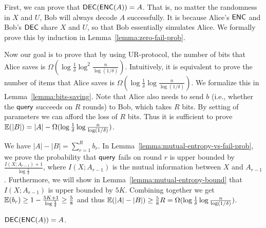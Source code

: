 First, we can prove that $\textsf{DEC}(\textsf{ENC}(A))=A$. That is, no matter the randomness in $X$ and $U$, Bob will always decode $A$ successfully. It is because Alice's $\textsf{ENC}$ and Bob's $\textsf{DEC}$ share $X$ and $U$, so that Bob essentially simulates Alice. We formally prove this by induction in Lemma~\ref{lemma:zero-fail-prob}. 

Now our goal is to prove that by using UR-protocol, the number of bits that Alice saves is $\Omega(\log \frac{1}{\delta}\log^2 \frac{n}{\log (1/\delta)} )$. Intuitively, it is equivalent to prove the number of items that Alice saves is $\Omega(\log \frac{1}{\delta}\log \frac{n}{\log (1/\delta)} )$.
We formalize this in Lemma~\ref{lemma:bits-saving}. Note that Alice also needs to send $b$ (i.e., whether the $\mathsf{query}$ succeeds on $R$ rounds) to Bob, which takes $R$ bits. By setting of parameters we can afford the loss of $R$ bits. Thus it is sufficient to prove $\operatorname*{\mathbb{E}}(|B|)=|A|-\Omega(\log \frac{1}{\delta}\log \frac{n}{\log (1/\delta)})$. 

We have $|A|-|B|=\sum_{r=1}^{R}b_r$. 
In Lemma~\ref{lemma:mutual-entropy-vs-fail-prob}, we prove the probability that $\mathsf{query}$ fails on round $r$ is upper bounded by $\frac{I(X;A_{r-1})+1}{\log \frac{1}{\delta}}$, where $I(X;A_{r-1})$ is the mutual information between $X$ and $A_{r-1}$. 
Furthermore, we will show in Lemma~\ref{lemma:mutual-entropy-bound} that $I(X;A_{r-1})$ is upper bounded by $5K$.
Combining together we get $\operatorname*{\mathbb{E}}(b_r)\ge 1-\frac{5K+1}{\log \frac{1}{\delta}}\ge \frac{5}{8}$ and thus $\operatorname*{\mathbb{E}}(|A|-|B|)\ge \frac{5}{8}R=\Omega(\log \frac{1}{\delta}\log \frac{n}{\log (1/\delta)})$.
 
\begin{lemma}\label{lemma:zero-fail-prob}
  $\textsf{DEC}(\textsf{ENC}(A))=A$.
\end{lemma}


